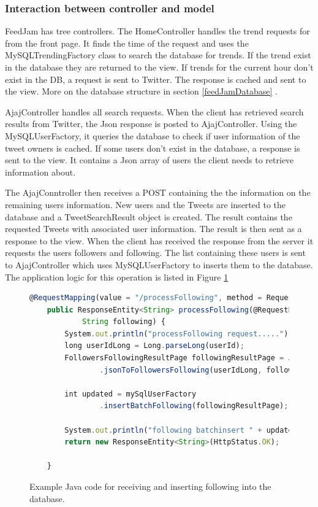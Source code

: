 \subsubsection{Interaction between controller and model} %
FeedJam has tree controllers. The HomeController handles the trend requests for from the front page. It finds the time of the request and uses the MySQLTrendingFactory class to search the database for trends. If the trend exist in the database they are returned to the view. If trends for the current hour don't exist in the DB, a request is sent to Twitter. The response is cached and sent to the view. More on the database structure in section \ref{feedJamDatabase} .

AjajController handles all search requests. When the client has retrieved search results from Twitter, the Json response is posted to AjajController. Using the MySQLUserFactory, it queries the database to check if user information of the tweet owners is cached. If some users don't exist in the database, a response is sent to the view. It contains a Json array of users the client needs to retrieve information about. 

The AjajConntroller then receives a POST containing the the information on the remaining users information. New users and the Tweets are inserted to the database and a TweetSearchResult object is created. The result contains the requested Tweets with associated user information. The result is then sent as a response to the view. When the client has received the response from the server it requests the users followers and following. The list containing these users is sent to AjajController which uses MySQLUserFactory to inserts them to the database. The application logic for this operation is listed in Figure \ref{javaProcessFollowing}

\begin{figure}[h!]
\begin{lstlisting}[language=javascript]
@RequestMapping(value = "/processFollowing", method = RequestMethod.POST)
	public ResponseEntity<String> processFollowing(@RequestParam String userId,
			String following) {
		System.out.println("processFollowing request.....");
		long userIdLong = Long.parseLong(userId);
		FollowersFollowingResultPage followingResultPage = JsonUserParser
				.jsonToFollowersFollowing(userIdLong, following);

		int updated = mySqlUserFactory
				.insertBatchFollowing(followingResultPage);

		System.out.println("following batchinsert " + updated);
		return new ResponseEntity<String>(HttpStatus.OK);

	}
\end{lstlisting}
\caption{Example Java code for receiving and inserting following into the database.}
\label{javaProcessFollowing}
\end{figure}

